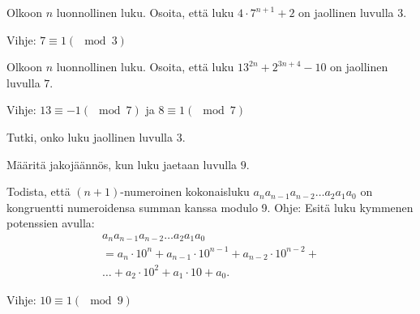 \begin{tehtavasivu}
\begin{tehtava}
  Olkoon $n$ luonnollinen luku. Osoita, että luku $4\cdot 7^{n+1}+2$ on jaollinen luvulla $3$.
  \begin{vastaus}
  Vihje: $7 \equiv 1 (\mod{3})$
  \end{vastaus}
\end{tehtava}

\begin{tehtava}
  Olkoon $n$ luonnollinen luku. Osoita, että luku $13^{2n} + 2^{3n+4} - 10$ on jaollinen luvulla $7$.
  \begin{vastaus}
  Vihje: $13 \equiv -1 (\mod{7})$ ja $8 \equiv 1 (\mod{7})$
  \end{vastaus}
\end{tehtava}

\begin{tehtava}
  Tutki, onko luku jaollinen luvulla $3$.
  \begin{alakohdat}
  \end{alakohdat}
  \begin{vastaus}
  \begin{alakohdat}
  \end{alakohdat}
  \end{vastaus}
\end{tehtava}

\begin{tehtava}
  Määritä jakojäännös, kun luku jaetaan luvulla $9$.
  \begin{alakohdat}
  \end{alakohdat}
  \begin{vastaus}
  \begin{alakohdat}
  \end{alakohdat}
  \end{vastaus}  
\end{tehtava}

\begin{tehtava}
  Todista, että $(n+1)$-numeroinen kokonaisluku $a_na_{n-1}a_{n-2}\ldots a_2a_1a_0$ on kongruentti numeroidensa summan kanssa modulo 9. Ohje: Esitä luku kymmenen potenssien avulla:
  \begin{multline*}
  a_na_{n-1}a_{n-2}\ldots a_2a_1a_0\\ = a_n \cdot 10^n + a_{n-1}\cdot 10^{n-1} + a_{n-2} \cdot 10^{n-2} + \\
  \ldots + a_2 \cdot 10^2 + a_1 \cdot 10 + a_0.
  \end{multline*}
  \begin{vastaus}
  Vihje: $10 \equiv 1 (\mod{9})$
  \end{vastaus}  
\end{tehtava}


\end{tehtavasivu}
